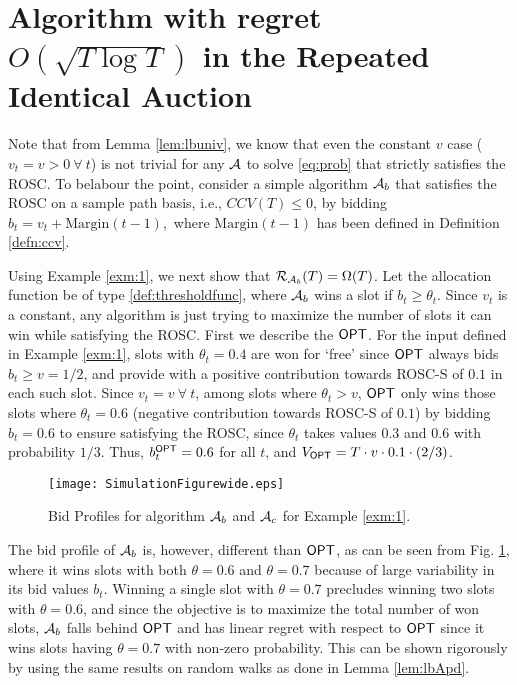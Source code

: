 \section{Algorithm with regret $O(\sqrt{T \log T})$ in the Repeated Identical Auction}
Note that from Lemma \ref{lem:lbuniv}, we know that even the constant $v$ case ($v_t=v >0 \ \forall \ t$) is not trivial for any $\mathcal{A}$ to solve \eqref{eq:prob} that strictly satisfies the ROSC. 
To belabour the point, consider a simple algorithm $\mathcal{A}_b$ that satisfies the ROSC on a sample path basis, i.e., $CCV(T)\le 0$, by  bidding $b_t = v_t+\text{Margin}(t-1),$ where $\text{Margin}(t-1)$ has been defined in Definition \ref{defn:ccv}. 


Using Example \ref{exm:1}, we next show that $\mathcal{R}_{\mathcal{A}_b}(T)=\Omega(T)$. Let the allocation function be of type \eqref{def:thresholdfunc}, where $\mathcal{A}_b$ wins a slot if $b_t \ge \theta_t$. 
Since $v_t$ is a constant, any algorithm is just trying to maximize the number of slots it can win while satisfying the ROSC. 
First we describe the $\mathsf{OPT}$. For the input defined in Example \ref{exm:1},  slots with $\theta_t=0.4$ are won for `free' since $\mathsf{OPT}$ always bids $b_t\ge v=1/2$, and provide with a positive contribution towards ROSC-S of $0.1$ in each such slot. %
Since $v_t=v \ \forall \ t$, among slots where $\theta_t>v$, $\mathsf{OPT}$ only wins those slots where $\theta_t=0.6$ (negative contribution towards ROSC-S of $0.1$) by bidding $b_t=0.6$ to ensure satisfying the ROSC, since $\theta_t$ takes values $0.3$ and $0.6$ with probability $1/3$. Thus, $b_t^{\mathsf{OPT}}=0.6$ for all $t$, and $V_{\mathsf{OPT}} = T\cdot v \cdot 0.1 \cdot (2/3)$.


  \begin{figure*}
        \texttt{[image: SimulationFigurewide.eps]}
        \caption{Bid Profiles for algorithm $\mathcal{A}_b$ and $\mathcal{A}_c$ for Example \ref{exm:1}.}
        \label{fig:1}
    \end{figure*}

The bid profile of $\mathcal{A}_b$ is, however, different than $\mathsf{OPT}$, as can be seen  from Fig. \ref{fig:1}, where it wins slots with both $\theta=0.6$ and $\theta=0.7$ because of large variability in its bid values $b_t$. Winning a single slot with $\theta=0.7$ precludes winning two slots with $\theta=0.6$, and since the objective is to maximize the total number of won slots, $\mathcal{A}_b$ falls behind $\mathsf{OPT}$ and has linear regret with respect to $\mathsf{OPT}$ since it wins slots having $\theta=0.7$ with non-zero probability. This can be shown rigorously by using the same results on random walks as done in Lemma \ref{lem:lbApd}.

